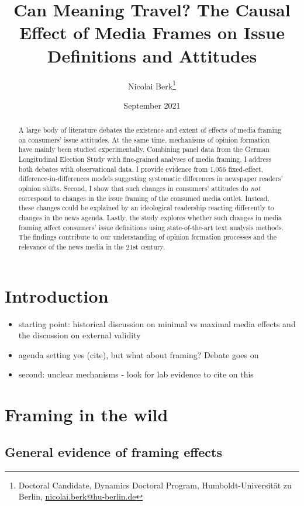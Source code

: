 \documentclass{article}
\title{Can Meaning Travel? The Causal Effect of Media Frames on Issue Definitions and Attitudes}
\author{Nicolai Berk\footnote{Doctoral Candidate, Dynamics Doctoral Program, Humboldt-Universität zu Berlin, \href{mailto:nicolai.berk@hu-berlin.de}{nicolai.berk@hu-berlin.de}}}
\date{September 2021}
\begin{document}
\maketitle


\begin{abstract}
    A large body of literature debates the existence and extent of effects of media framing on consumers' issue attitudes. At the same time, mechanisms of opinion formation have mainly been studied experimentally. Combining panel data from the German Longitudinal Election Study with fine-grained analyses of media framing, I address both debates with observational data. I provide evidence from 1,056 fixed-effect, difference-in-differences models suggesting systematic differences in newspaper readers' opinion shifts. Second, I show that such changes in consumers' attitudes do \textit{not} correspond to changes in the issue framing of the consumed media outlet. Instead, these changes could be explained by an ideological readership reacting differently to changes in the news agenda. Lastly, the study explores whether such changes in media framing affect consumers' issue definitions using state-of-the-art text analysis methods. The findings contribute to our understanding of opinion formation processes and the relevance of the news media in the 21st century.
\end{abstract}


\section{Introduction}

\begin{itemize}
  \item starting point: historical discussion on minimal vs maximal media effects and the discussion on external validity
  \item agenda setting yes (cite), but what about framing? Debate goes on
  \item second: unclear mechanisms - look for lab evidence to cite on this
\end{itemize}


\section{Framing in the wild}

\subsection{General evidence of framing effects}
\end{document}
